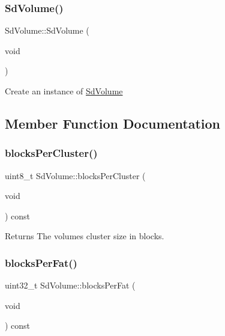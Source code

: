 \subsubsection{\texorpdfstring{Sd\+Volume()}{SdVolume()}}
{\footnotesize\ttfamily Sd\+Volume\+::\+Sd\+Volume (\begin{DoxyParamCaption}\item[{void}]{ }\end{DoxyParamCaption})\hspace{0.3cm}{\ttfamily [inline]}}

Create an instance of \hyperlink{class_sd_volume}{Sd\+Volume} 

\subsection{Member Function Documentation}
\mbox{\label{class_sd_volume_ad6cb99a5d4e9e53651297b999eb2256f}} 
\subsubsection{\texorpdfstring{blocks\+Per\+Cluster()}{blocksPerCluster()}}
{\footnotesize\ttfamily uint8\+\_\+t Sd\+Volume\+::blocks\+Per\+Cluster (\begin{DoxyParamCaption}\item[{void}]{ }\end{DoxyParamCaption}) const\hspace{0.3cm}{\ttfamily [inline]}}

\begin{DoxyReturn}{Returns}
The volume\textquotesingle{}s cluster size in blocks. 
\end{DoxyReturn}
\mbox{\label{class_sd_volume_a783bfc6ced6f6af86c1e94d394ebe76c}} 
\subsubsection{\texorpdfstring{blocks\+Per\+Fat()}{blocksPerFat()}}
{\footnotesize\ttfamily uint32\+\_\+t Sd\+Volume\+::blocks\+Per\+Fat (\begin{DoxyParamCaption}\item[{void}]{ }\end{DoxyParamCaption}) const\hspace{0.3cm}{\ttfamily [inline]}}

